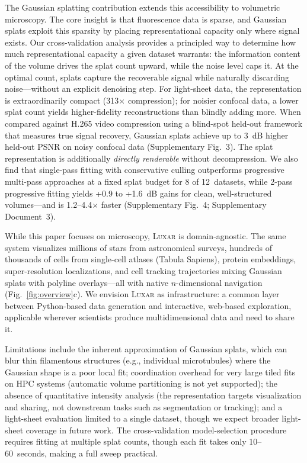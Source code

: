 \documentclass[10pt,twocolumn,letterpaper]{article}
\newcommand{\luxar}{\textsc{Luxar}\xspace}
\begin{document}
The Gaussian splatting contribution extends this accessibility to volumetric microscopy.
The core insight is that fluorescence data is sparse, and Gaussian splats exploit this sparsity by placing representational capacity only where signal exists.
Our cross-validation analysis provides a principled way to determine how much representational capacity a given dataset warrants: the information content of the volume drives the splat count upward, while the noise level caps it.
At the optimal count, splats capture the recoverable signal while naturally discarding noise---without an explicit denoising step.
For light-sheet data, the representation is extraordinarily compact (313$\times$ compression); for noisier confocal data, a lower splat count yields higher-fidelity reconstructions than blindly adding more.
When compared against H.265 video compression using a blind-spot held-out framework that measures true signal recovery, Gaussian splats achieve up to 3~dB higher held-out PSNR on noisy confocal data (Supplementary Fig.~3).
The splat representation is additionally \emph{directly renderable} without decompression.
We also find that single-pass fitting with conservative culling outperforms progressive multi-pass approaches at a fixed splat budget for 8 of 12~datasets, while 2-pass progressive fitting yields +0.9 to +1.6~dB gains for clean, well-structured volumes---and is 1.2--4.4$\times$ faster (Supplementary Fig.~4; Supplementary Document~3).

While this paper focuses on microscopy, \luxar is domain-agnostic.
The same system visualizes millions of stars from astronomical surveys\cite{gaiacollaboration2023gaia}, hundreds of thousands of cells from single-cell atlases\cite{tabula2022tabula} (Tabula Sapiens), protein embeddings, super-resolution localizations, and cell tracking trajectories mixing Gaussian splats with polyline overlays---all with native $n$-dimensional navigation (Fig.~\ref{fig:overview}c).
We envision \luxar as infrastructure: a common layer between Python-based data generation and interactive, web-based exploration, applicable wherever scientists produce multidimensional data and need to share it.

Limitations include the inherent approximation of Gaussian splats, which can blur thin filamentous structures (e.g., individual microtubules) where the Gaussian shape is a poor local fit; coordination overhead for very large tiled fits on HPC systems (automatic volume partitioning is not yet supported); the absence of quantitative intensity analysis (the representation targets visualization and sharing, not downstream tasks such as segmentation or tracking); and a light-sheet evaluation limited to a single dataset, though we expect broader light-sheet coverage in future work.
The cross-validation model-selection procedure requires fitting at multiple splat counts, though each fit takes only 10--60~seconds, making a full sweep practical.
\end{document}
